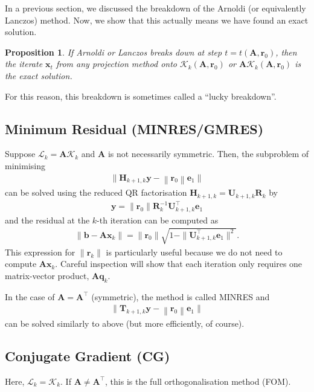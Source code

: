 \documentclass[12pt,a4paper]{article} %
\newtheorem*{proposition}{Proposition}
\begin{document}
In a previous section, we discussed the breakdown of the Arnoldi (or equivalently Lanczos)
method. Now, we show that this actually means we have found an exact solution.
\begin{proposition}
    If Arnoldi or Lanczos breaks down at step $t = t(\mathbf A, \bm r_0)$, 
    then the iterate $\bm x_t$ from any projection method onto 
    $\mathcal K_k(\mathbf A, \bm r_0)$ or $\mathbf A \mathcal K_k(\mathbf A, \bm r_0)$
    is the exact solution.
\end{proposition}
For this reason, this breakdown is sometimes called a ``lucky breakdown''.

\subsection{Minimum Residual (MINRES/GMRES)}
Suppose $\mathcal L_k = \mathbf A\mathcal K_k$ and $\mathbf A$ is not necessarily symmetric. 
Then, the subproblem of minimising
\begin{align*}
    \Big\|\mathbf{H}_{k+1,k} \bm{y}-\left\|\bm{r}_{0}\right\| \bm{e}_{1}\Big\|
\end{align*}
can be solved using the reduced QR factorisation $\mathbf{H}_{k+1,k} = \mathbf U_{k+1,k}\mathbf R_k$
by
\begin{align*}
    \bm y = \| \bm r_0 \| \mathbf R_k^{-1} \mathbf U_{k+1,k}^\top \bm e_1
\end{align*}
and the residual at the $k$-th iteration can be computed as 
\begin{align*}
    \| \bm b - \mathbf A \bm x_k \| = \| \bm r_0 \| \sqrt{1 - \|\mathbf U_{k+1,k}^\top \bm e_1 \|^2}.
\end{align*}
This expression for $\| \bm r_k\|$ is particularly useful because we do not need to compute  $\mathbf A \bm x_k$.
Careful inspection will show that each iteration only requires one matrix-vector product, 
$\mathbf A \bm q_k$.

In the case of $\mathbf A = \mathbf A^\top$ (symmetric), the method is 
called MINRES and 
\begin{align*}
    \Big\|\mathbf{T}_{k+1,k} \bm{y}-\left\|\bm{r}_{0}\right\| \bm{e}_{1}\Big\|
\end{align*}
can be solved similarly to above (but more efficiently, of course).

\subsection{Conjugate Gradient (CG)}
Here, $\mathcal L_k = \mathcal K_k$. If $\mathbf A \ne \mathbf A^\top$, this is the 
full orthogonalisation method (FOM).
\end{document}
